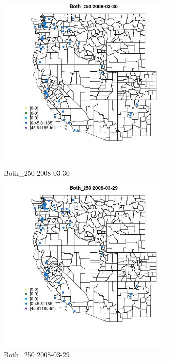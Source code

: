 \begin{figure} 
\centering  
\includegraphics[width=0.77\textwidth]{Code_Outputs/Report_ML_input_PM25_Step4_part_e_de_duplicated_aves_MapObsBoth_2502008-03-30.jpg} 
\caption{\label{fig:Report_ML_input_PM25_Step4_part_e_de_duplicated_avesMapObsBoth_2502008-03-30}Both_250 2008-03-30} 
\end{figure} 
 

\begin{figure} 
\centering  
\includegraphics[width=0.77\textwidth]{Code_Outputs/Report_ML_input_PM25_Step4_part_e_de_duplicated_aves_MapObsBoth_2502008-03-29.jpg} 
\caption{\label{fig:Report_ML_input_PM25_Step4_part_e_de_duplicated_avesMapObsBoth_2502008-03-29}Both_250 2008-03-29} 
\end{figure} 
 

